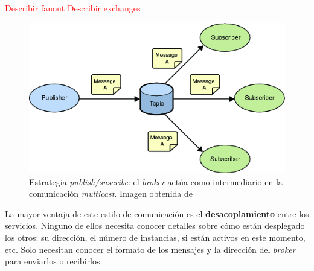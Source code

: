 \textcolor{red}{Describir fanout}
\textcolor{red}{Describir exchanges}

\begin{figure}[htb]
  \centering
  \includegraphics[scale=0.5]{03_arquitectura/images/publish_subscribe}
  \caption[Estrategia \emph{publish/suscribe}: el \emph{broker} actúa como intermediario en la comunicación \emph{multicast}.]{Estrategia \emph{publish/suscribe}: el \emph{broker} actúa como intermediario en la comunicación \emph{multicast}. Imagen obtenida de \footnotemark}
  \label{fig:publish-subscribe}
\end{figure}


La mayor ventaja de este estilo de comunicación es el \textbf{desacoplamiento} entre los servicios. \cite{korabUnderstandingMessageBrokers2017}
Ninguno de ellos necesita conocer detalles sobre cómo están desplegado los otros: su dirección, el número de instancias, si están activos en este momento, etc. Solo necesitan conocer el formato de los mensajes y la dirección del \emph{broker} para enviarlos o recibirlos.

